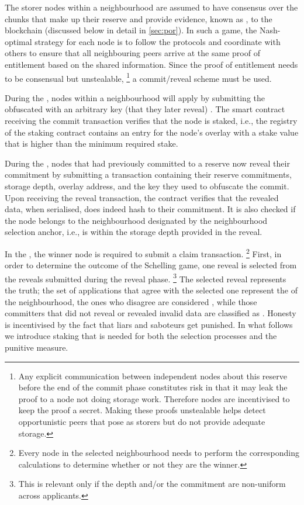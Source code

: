 The storer nodes within a neighbourhood are assumed to have  consensus over the chunks that make up their reserve and provide evidence, known as , to the blockchain (discussed below in detail in \ref{sec:por}). In such a game, the Nash-optimal strategy for each node is to follow the protocols and coordinate with others to ensure that all neighbouring peers arrive at the same proof of entitlement based on the shared information. Since the proof of entitlement needs to be consensual but unstealable,%
%
\footnote{%
Any explicit communication between independent nodes about this reserve before the end of the commit phase constitutes risk in that it may leak the proof to a node not doing storage work. Therefore nodes are incentivised to keep the proof a secret. Making these proofs unstealable helps detect opportunistic peers that pose as storers but do not provide adequate storage.}
%
a commit/reveal scheme must be used.

During the , nodes within a neighbourhood will apply by submitting the  obfuscated with an arbitrary key (that they later reveal)%
. The smart contract receiving the commit transaction verifies that the node is staked, i.e., the registry of the staking contract contains an entry for the node's overlay with a stake value that is higher than the minimum required stake.

During the , nodes that had previously committed to a reserve now reveal their commitment by submitting a transaction containing
their reserve commitments, storage depth, overlay address, and the key they used to obfuscate the commit.
Upon receiving the reveal transaction, the contract  verifies that the revealed data, when serialised, does indeed hash to their commitment. It is also checked if the node belongs to the neighbourhood designated by the neighbourhood selection anchor, i.e., is within the storage depth provided in the reveal.

In the , the winner node is required to submit a claim transaction.%
%
\footnote{Every node in the selected neighbourhood needs to perform the corresponding calculations to determine whether or not they are the winner.}
%
First, in order to determine the outcome of the Schelling game, one reveal is selected  from the reveals submitted during the reveal phase.%
%
\footnote{This is relevant only if the depth and/or the commitment are non-uniform across applicants.}
%
The selected reveal represents the truth; the set of applications that agree with the selected one represent the  of the neighbourhood, the ones who disagree are considered , while those committers that did not reveal or revealed invalid data are classified as . Honesty is incentivised by the fact that liars and saboteurs get punished. In what follows we introduce staking that is needed for both the selection processes and the punitive measure.


